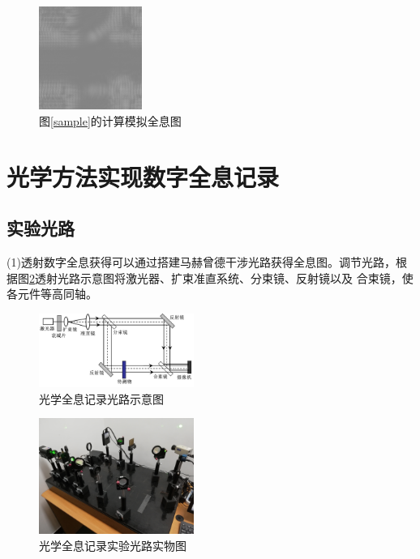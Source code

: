 \documentclass[10pt,a4paper,twocolumn,twoside,UTF8]{ctexart}
\begin{document}
		\begin{figure}[H]
			\centering
			\includegraphics[width=0.3\textwidth]{img//1.2.jpg}
			\caption{图\ref{sample}的计算模拟全息图}
			\label{holo1}
		\end{figure}

	\section{光学方法实现数字全息记录}

		\subsection{实验光路}
		(1)透射数字全息获得可以通过搭建马赫曾德干涉光路获得全息图。调节光路，根据图\ref{eq1show}透射光路示意图将激光器、扩束准直系统、分束镜、反射镜以及	合束镜，使各元件等高同轴。
		\begin{figure}[H]
			\centering
			\includegraphics[width=0.45\textwidth]{img//eq11.jpg}
			\caption{光学全息记录光路示意图}
			\label{eq1show}
		\end{figure}
		\begin{figure}[H]
			\centering
			\includegraphics[width=0.45\textwidth]{img//eq1.jpg}
			\caption{光学全息记录实验光路实物图}
			\label{eq1}
		\end{figure}
\end{document}
